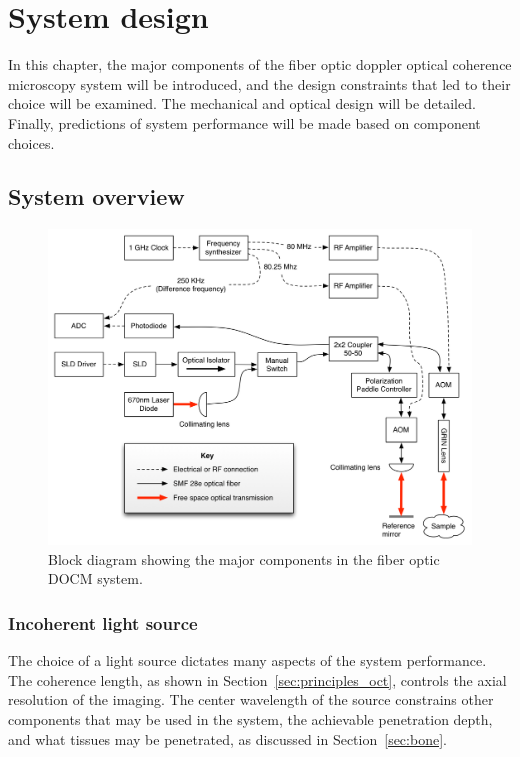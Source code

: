 \chapter{System design}

In this chapter, the major components of the fiber optic doppler optical coherence microscopy system will be introduced, and the design constraints that led to their choice will be examined. The mechanical and optical design will be detailed. Finally, predictions of system performance will be made based on component choices.

\section{System overview}

\begin{figure}[h!]
\centering
\includegraphics[width=1.1\textwidth]{Images/Background/actual_system_vertical.png}
\caption{Block diagram showing the major components in the fiber optic DOCM system.}
\end{figure}

\subsection{Incoherent light source}

The choice of a light source dictates many aspects of the system performance. The coherence length, as shown in Section~\ref{sec:principles_oct}, controls the axial resolution of the imaging. The center wavelength of the source constrains other components that may be used in the system, the achievable penetration depth, and what tissues may be penetrated, as discussed in Section~\ref{sec:bone}.

